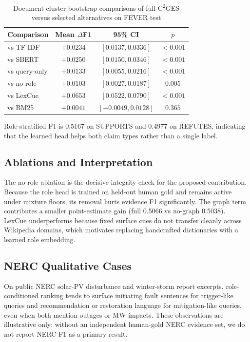 \documentclass[cmc,article,submit,moreauthors,pdftex]{Definitions/tsp}
\newcommand{\cges}{C\textsuperscript{2}GES}
\begin{document}
\begin{table}[!ht]
\centering
\caption{Document-cluster bootstrap comparisons of full \cges{} versus selected alternatives on FEVER test}
\label{tab:bootstrap}
\begin{tabular}{lccc}
\toprule
Comparison & Mean $\Delta$F1 & 95\% CI & $p$ \\
\midrule
vs TF-IDF & $+0.0234$ & $[0.0137,0.0336]$ & $<0.001$ \\
vs SBERT & $+0.0250$ & $[0.0150,0.0346]$ & $<0.001$ \\
vs query-only & $+0.0133$ & $[0.0055,0.0216]$ & $<0.001$ \\
vs no-role & $+0.0103$ & $[0.0027,0.0187]$ & $0.005$ \\
vs LexCue & $+0.0653$ & $[0.0522,0.0790]$ & $<0.001$ \\
vs BM25 & $+0.0041$ & $[-0.0049,0.0128]$ & $0.365$ \\
\bottomrule
\end{tabular}
\end{table}

Role-stratified F1 is 0.5167 on SUPPORTS and 0.4977 on REFUTES, indicating that the learned head helps both claim types rather than a single label.

\subsection{Ablations and Interpretation}
The no-role ablation is the decisive integrity check for the proposed contribution. Because the role head is trained on held-out human gold and remains active under mixture floors, its removal hurts evidence F1 significantly. The graph term contributes a smaller point-estimate gain (full 0.5066 vs no-graph 0.5038). LexCue underperforms because fixed surface cues do not transfer cleanly across Wikipedia domains, which motivates replacing handcrafted dictionaries with a learned role embedding.

\subsection{NERC Qualitative Cases}
On public NERC solar-PV disturbance and winter-storm report excerpts, role-conditioned ranking tends to surface initiating fault sentences for trigger-like queries and recommendation or restoration language for mitigation-like queries, even when both mention outages or MW impacts. These observations are illustrative only: without an independent human-gold NERC evidence set, we do not report NERC F1 as a primary result.
\end{document}
